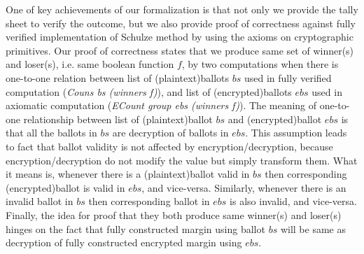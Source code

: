 \documentclass{llncs}
\begin{document}
One of key achievements of our formalization is that
not only we provide the tally sheet  
to verify the outcome, but we also provide 
proof of correctness against fully verified implementation of 
Schulze method\cite{Pattinson:2017:SVE} by using the 
axioms on cryptographic primitives. Our proof of correctness
states that we produce same set of winner(s) and loser(s), i.e. same boolean 
function $f$, by two computations 
when there is one-to-one relation between list of (plaintext)ballots 
$bs$ used  in fully verified computation 
(\textit{Couns bs (winners f)})\cite{Pattinson:2017:SVE}, 
and list of (encrypted)ballots $ebs$ used in axiomatic computation 
(\textit{ECount group ebs (winners f)}). 
The meaning of 
one-to-one relationship between list of (plaintext)ballot $bs$ and
(encrypted)ballot $ebs$ is that all the ballots in $bs$ are decryption
of ballots in $ebs$. This assumption leads to fact that
ballot validity is not affected by encryption/decryption, because 
encryption/decryption do not modify the value %
but simply transform them. What it means is, whenever there is a (plaintext)ballot valid in 
$bs$ then corresponding (encrypted)ballot is valid in $ebs$, and vice-versa.
Similarly, whenever there is an invalid ballot in $bs$ then 
corresponding ballot in $ebs$ is also invalid, and vice-versa.
Finally, the idea for proof that they both produce same winner(s) and 
loser(s) hinges on the 
fact that fully constructed margin using ballot $bs$ will be same as 
decryption of fully constructed encrypted margin using $ebs$. 
%
%
\end{document}
